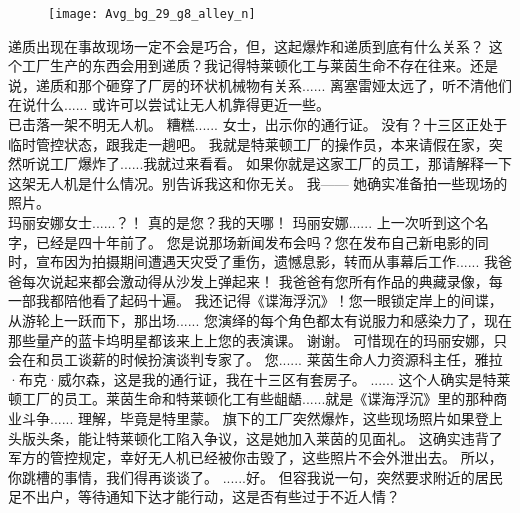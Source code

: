 \documentclass[openany]{book}
\begin{document}
\begin{figure}[h]
    \centering
    \texttt{[image: Avg\_bg\_29\_g8\_alley\_n]}
\end{figure}
\begin{dialogue}
     递质出现在事故现场一定不会是巧合，但，这起爆炸和递质到底有什么关系？
     这个工厂生产的东西会用到递质？我记得特莱顿化工与莱茵生命不存在往来。还是说，递质和那个砸穿了厂房的环状机械物有关系......
     离塞雷娅太远了，听不清他们在说什么......
     或许可以尝试让无人机靠得更近一些。
    \\
     已击落一架不明无人机。
     糟糕......
     女士，出示你的通行证。
     没有？十三区正处于临时管控状态，跟我走一趟吧。
     我就是特莱顿工厂的操作员，本来请假在家，突然听说工厂爆炸了......我就过来看看。
     如果你就是这家工厂的员工，那请解释一下这架无人机是什么情况。别告诉我这和你无关。
     我——
     她确实准备拍一些现场的照片。
    \\
     玛丽安娜女士......？！
     真的是您？我的天哪！
     玛丽安娜......
     上一次听到这个名字，已经是四十年前了。
     您是说那场新闻发布会吗？您在发布自己新电影的同时，宣布因为拍摄期间遭遇天灾受了重伤，遗憾息影，转而从事幕后工作......
     我爸爸每次说起来都会激动得从沙发上弹起来！
     我爸爸有您所有作品的典藏录像，每一部我都陪他看了起码十遍。
     我还记得《谍海浮沉》！您一眼锁定岸上的间谍，从游轮上一跃而下，那出场......
     您演绎的每个角色都太有说服力和感染力了，现在那些量产的蓝卡坞明星都该来上上您的表演课。
     谢谢。
     可惜现在的玛丽安娜，只会在和员工谈薪的时候扮演谈判专家了。
     您......
     莱茵生命人力资源科主任，雅拉·布克·威尔森，这是我的通行证，我在十三区有套房子。
     ......
     这个人确实是特莱顿工厂的员工。莱茵生命和特莱顿化工有些龃龉......就是《谍海浮沉》里的那种商业斗争......
     理解，毕竟是特里蒙。
     旗下的工厂突然爆炸，这些现场照片如果登上头版头条，能让特莱顿化工陷入争议，这是她加入莱茵的见面礼。
     这确实违背了军方的管控规定，幸好无人机已经被你击毁了，这些照片不会外泄出去。
     所以，你跳槽的事情，我们得再谈谈了。
     ......好。
     但容我说一句，突然要求附近的居民足不出户，等待通知下达才能行动，这是否有些过于不近人情？

\end{dialogue}
\end{document}
